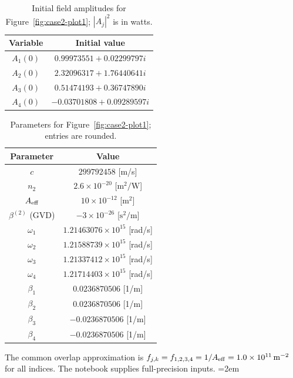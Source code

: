 \documentclass[11pt,a4paper]{article}
\numberwithin{equation}{section}
\begin{document}
\begin{table}[H]\centering
\caption{Initial field amplitudes for Figure~\ref{fig:case2-plot1}; $|A_j|^2$ is in watts.}
\label{tab:case2-init}
\begin{tabular}{cc}\hline Variable & Initial value \\ \hline
$A_1(0)$ & $0.99973551+0.02299797i$ \\
$A_2(0)$ & $2.32096317+1.76440641i$ \\
$A_3(0)$ & $0.51474193+0.36747890i$ \\
$A_4(0)$ & $-0.03701808+0.09289597i$ \\
\hline\end{tabular}\end{table}
\begin{table}[H]\centering
\caption{Parameters for Figure~\ref{fig:case2-plot1}; entries are rounded.}
\label{tab:case2-physical}
\begin{tabular}{cc}\hline Parameter & Value \\ \hline
$c$ & $299792458$ [m/s] \\
$n_2$ & $2.6\times10^{-20}$ [$\mathrm m^2/\mathrm W$] \\
$A_{\rm eff}$ & $10\times10^{-12}$ [$\mathrm m^2$] \\
$\beta^{(2)}$ (GVD) & $-3\times10^{-26}$ [$\mathrm s^2/\mathrm m$] \\
$\omega_1$ & $1.21463076\times10^{15}$ [rad/s] \\
$\omega_2$ & $1.21588739\times10^{15}$ [rad/s] \\
$\omega_3$ & $1.21337412\times10^{15}$ [rad/s] \\
$\omega_4$ & $1.21714403\times10^{15}$ [rad/s] \\
$\beta_1$ & $0.0236870506$ [1/m] \\
$\beta_2$ & $0.0236870506$ [1/m] \\
$\beta_3$ & $-0.0236870506$ [1/m] \\
$\beta_4$ & $-0.0236870506$ [1/m] \\
\hline\end{tabular}\end{table}
The common overlap approximation is $f_{j,k}=f_{1,2,3,4}=1/A_{\rm eff}=1.0\times10^{11}\,\mathrm m^{-2}$ for all indices.
The notebook supplies full-precision inputs.
\begingroup
\emergencystretch=2em
\printbibliography
\endgroup
\end{document}
